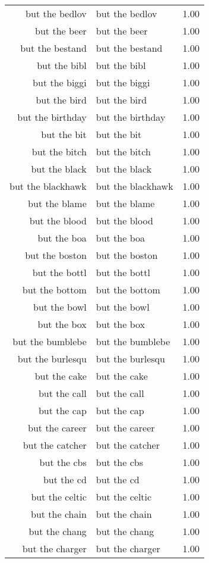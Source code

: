 \begin{table}[ht]
\begin{tabular}{rlr}
  but the bedlov & but the bedlov & 1.00 \\ 
  but the beer & but the beer & 1.00 \\ 
  but the bestand & but the bestand & 1.00 \\ 
  but the bibl & but the bibl & 1.00 \\ 
  but the biggi & but the biggi & 1.00 \\ 
  but the bird & but the bird & 1.00 \\ 
  but the birthday & but the birthday & 1.00 \\ 
  but the bit & but the bit & 1.00 \\ 
  but the bitch & but the bitch & 1.00 \\ 
  but the black & but the black & 1.00 \\ 
  but the blackhawk & but the blackhawk & 1.00 \\ 
  but the blame & but the blame & 1.00 \\ 
  but the blood & but the blood & 1.00 \\ 
  but the boa & but the boa & 1.00 \\ 
  but the boston & but the boston & 1.00 \\ 
  but the bottl & but the bottl & 1.00 \\ 
  but the bottom & but the bottom & 1.00 \\ 
  but the bowl & but the bowl & 1.00 \\ 
  but the box & but the box & 1.00 \\ 
  but the bumblebe & but the bumblebe & 1.00 \\ 
  but the burlesqu & but the burlesqu & 1.00 \\ 
  but the cake & but the cake & 1.00 \\ 
  but the call & but the call & 1.00 \\ 
  but the cap & but the cap & 1.00 \\ 
  but the career & but the career & 1.00 \\ 
  but the catcher & but the catcher & 1.00 \\ 
  but the cbs & but the cbs & 1.00 \\ 
  but the cd & but the cd & 1.00 \\ 
  but the celtic & but the celtic & 1.00 \\ 
  but the chain & but the chain & 1.00 \\ 
  but the chang & but the chang & 1.00 \\ 
  but the charger & but the charger & 1.00 \\ 

\end{tabular}
\end{table}
